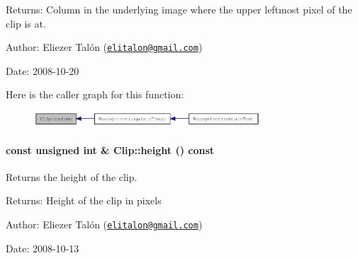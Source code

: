 \begin{Desc}
\item[Returns:]Column in the underlying image where the upper leftmost pixel of the clip is at.\end{Desc}
\begin{Desc}
\item[Author:]Eliezer Talón (\href{mailto:elitalon@gmail.com}{\tt elitalon@gmail.com}) \end{Desc}
\begin{Desc}
\item[Date:]2008-10-20 \end{Desc}


Here is the caller graph for this function:\nopagebreak
\begin{figure}[H]
\begin{center}
\leavevmode
\includegraphics[width=239pt]{class_clip_06a34378fa0f23425d10bb04e9972a26_icgraph}
\end{center}
\end{figure}
\hypertarget{class_clip_939908a8dde602d25335792cc0fd5d97}{
\paragraph[{height}]{\setlength{\rightskip}{0pt plus 5cm}const unsigned int \& Clip::height () const}\hfill}
\label{class_clip_939908a8dde602d25335792cc0fd5d97}


Returns the height of the clip. 

\begin{Desc}
\item[Returns:]Height of the clip in pixels\end{Desc}
\begin{Desc}
\item[Author:]Eliezer Talón (\href{mailto:elitalon@gmail.com}{\tt elitalon@gmail.com}) \end{Desc}
\begin{Desc}
\item[Date:]2008-10-13 \end{Desc}


